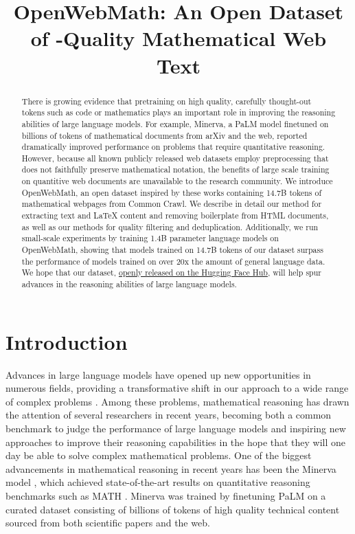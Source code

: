 \title{OpenWebMath: An Open Dataset of -Quality Mathematical Web Text}

\begin{abstract}
There is growing evidence that pretraining on high quality, carefully thought-out tokens such as code or mathematics plays an important role in improving the reasoning abilities of large language models. For example, Minerva, a PaLM model finetuned on billions of tokens of mathematical documents from arXiv and the web, reported dramatically improved performance on problems that require quantitative reasoning. However, because all known publicly released web datasets employ preprocessing that does not faithfully preserve mathematical notation, the benefits of large scale training on quantitive web documents are unavailable to the research community. We introduce OpenWebMath, an open dataset inspired by these works containing 14.7B tokens of mathematical webpages from Common Crawl. We describe in detail our method for extracting text and \LaTeX{} content and removing boilerplate from HTML documents, as well as our methods for quality filtering and deduplication. Additionally, we run small-scale experiments by training 1.4B parameter language models on OpenWebMath, showing that models trained on 14.7B tokens of our dataset surpass the performance of models trained on over 20x the amount of general language data. We hope that our dataset, \href{https://huggingface.co/datasets/open-web-math/open-web-math}{openly released on the Hugging Face Hub}, will help spur advances in the reasoning abilities of large language models.
\end{abstract}

\section{Introduction}
Advances in large language models have opened up new opportunities in numerous fields, providing a transformative shift in our approach to a wide range of complex problems \citep{gpt3, raffel2020exploring}. Among these problems, mathematical reasoning has drawn the attention of several researchers in recent years, becoming both a common benchmark to judge the performance of large language models and inspiring new approaches to improve their reasoning capabilities in the hope that they will one day be able to solve complex mathematical problems. One of the biggest advancements in mathematical reasoning in recent years has been the Minerva model \citep{lewkowycz2022solving}, which achieved state-of-the-art results on quantitative reasoning benchmarks such as MATH \citep{mathdataset}. Minerva was trained by finetuning PaLM \citep{palm} on a curated dataset consisting of billions of tokens of high quality technical content sourced from both scientific papers and the web.

